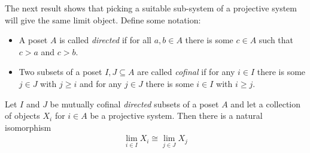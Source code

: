         The next result shows that picking a suitable sub-system of a projective system will give the same limit object.
        Define some notation:
        \begin{itemize}
          \item A poset $A$ is called \emph{directed} if for all $a,b\in A$ there is some $c\in A$ such that $c>a$ and $c>b$.
          \item Two subsets of a poset $I,J\subseteq A$ are called \emph{cofinal} if for any $i\in I$ there is some $j\in J$ with $j\ge i$ and for any $j\in J$ there is some $i\in I$ with $i\ge j$.
        \end{itemize}
        \begin{thm}
          Let $I$ and $J$ be mutually cofinal \emph{directed} subsets of a poset $A$ and let a collection of objects $X_i$ for $i\in A$ be a projective system.
          Then there is a natural isomorphism
          \begin{align*}
            \lim_{i\in I} X_i \cong \lim_{j\in J} X_j
          \end{align*}
        \end{thm}
